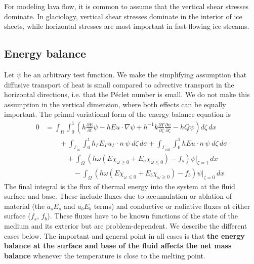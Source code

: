 \documentclass{article}
\theoremstyle{definition}
\theoremstyle{plain}
\begin{document}
For modeling lava flow, it is common to assume that the vertical shear stresses dominate.
In glaciology, vertical shear stresses dominate in the interior of ice sheets, while horizontal stresses are most important in fast-flowing ice streams.

\subsection{Energy balance}

Let $\psi$ be an arbitrary test function.
We make the simplifying assumption that diffusive transport of heat is small compared to advective transport in the horizontal directions, i.e. that the P\'eclet number is small.
We do not make this assumption in the vertical dimension, where both effects can be equally important.
The primal variational form of the energy balance equation is
\begin{align}
    0 & = \int_\Omega\int_0^1\left(h\frac{\partial E}{\partial t}\psi - hEu\cdot\nabla\psi + h^{-1}k\frac{\partial T}{\partial\zeta}\frac{\partial\psi}{\partial\zeta} - hQ\psi\right)d\zeta\,dx \nonumber\\
    & \qquad +\int_{\Gamma_{\text{in}}}\int_0^1h_\Gamma E_\Gamma u_\Gamma\cdot n\,\psi\;d\zeta\,d\sigma + \int_{\Gamma_{\text{out}}}\int_0^1 hEu\cdot n\,\psi\;d\zeta\,d\sigma \nonumber \\
    & \quad\qquad + \int_\Omega\left(h\omega(E\chi_{\omega\ge 0} + E_a\chi_{\omega \le 0}) - f_s\right)\psi\big|_{\zeta = 1}\,dx \nonumber \\
    & \qquad\qquad - \int_\Omega\left(h\omega(E\chi_{\omega\le 0} + E_b\chi_{\omega\ge 0}) - f_b\right)\psi\big|_{\zeta = 0}\,dx
    \label{eq:energy-balance}
\end{align}
The final integral is the flux of thermal energy into the system at the fluid surface and base.
These include fluxes due to accumulation or ablation of material (the $\dot a_sE_s$ and $\dot a_bE_b$ terms) and conductive or radiative fluxes at either surface ($f_s$, $f_b$).
These fluxes have to be known functions of the state of the medium and its exterior but are problem-dependent.
We describe the different cases below.
The important and general point in all cases is that \textbf{the energy balance at the surface and base of the fluid affects the net mass balance} whenever the temperature is close to the melting point.
\end{document}
